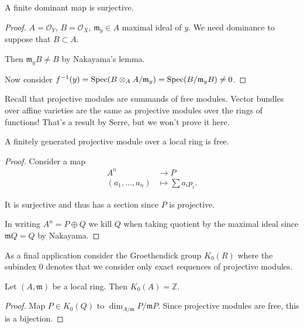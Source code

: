 \begin{theorem}
\label{theorem-finite-dominant-surjective}
A finite dominant map is surjective.
\end{theorem}

\begin{proof}
$A = \mathcal{O}_Y$, $B=\mathcal{O}_X$,
$\mathfrak{m}_y \in A$ maximal ideal of $y$.
We need dominance to suppose that
$B \subset A$.

Then $\mathfrak{m}_yB \neq B$ by
Nakayama's lemma.

Now consider $f^{-1}(y)
=\mathop{\mathrm{Spec}}(B \otimes_A A/\mathfrak{m}_y)
=\mathop{\mathrm{Spec}}(B /\mathfrak{m}_yB)\neq 0$.
\end{proof}

\medskip\noindent
Recall that projective modules
are summands of free modules.
Vector bundles over affine varieties
are the same as projective modules
over the rings of functions!
That's a result by Serre, but we won't
prove it here.

\begin{theorem}
\label{theorem-projective-locally-free}
A finitely generated projective module
over a local ring is free.
\end{theorem}

\begin{proof}
Consider a map
$$
\begin{aligned}
A^n &\longrightarrow P \\
(a_1,…,a_n) &\longmapsto \sum a_ip_i.
\end{aligned}
$$

It is surjective and thus has a section
since $P$ is projective.

In writing
$A^n = P \oplus Q$
we kill $Q$ when taking quotient
by the maximal ideal
since $\mathfrak{m} Q = Q$
by Nakayama.
\end{proof}

\medskip\noindent
As a final application consider the
Groethendick group $K_0(R)$
where the subindex 0 denotes
that we consider only exact sequences
of projective modules.

\begin{proposition}
\label{proposition-grothendieck-projective}
Let $(A,\mathfrak{m})$
be a local ring.
Then $K_0(A) = \mathbb{Z}$.
\end{proposition}

\begin{proof}
Map $P \in K_0(Q)$ to
$\dim_{A/\mathfrak{m}}P/\mathfrak{m}P$.
Since projective modules are free,
this is a bijection.
\end{proof}


